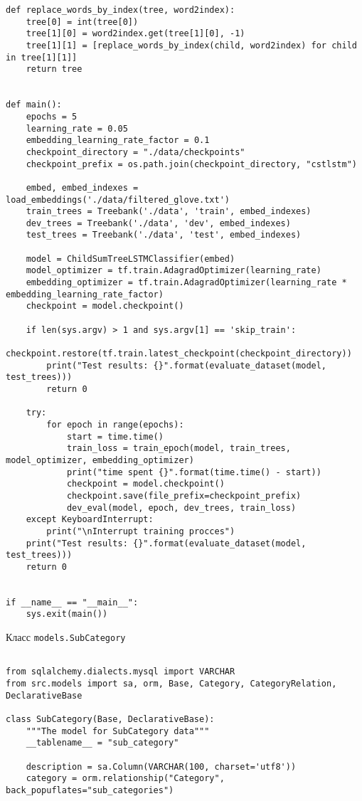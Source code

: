 \begin{lstlisting}[style=app]
def replace_words_by_index(tree, word2index):
    tree[0] = int(tree[0])
    tree[1][0] = word2index.get(tree[1][0], -1)
    tree[1][1] = [replace_words_by_index(child, word2index) for child in tree[1][1]]
    return tree


def main():
    epochs = 5
    learning_rate = 0.05
    embedding_learning_rate_factor = 0.1
    checkpoint_directory = "./data/checkpoints"
    checkpoint_prefix = os.path.join(checkpoint_directory, "cstlstm")

    embed, embed_indexes = load_embeddings('./data/filtered_glove.txt')
    train_trees = Treebank('./data', 'train', embed_indexes)
    dev_trees = Treebank('./data', 'dev', embed_indexes)
    test_trees = Treebank('./data', 'test', embed_indexes)

    model = ChildSumTreeLSTMClassifier(embed)
    model_optimizer = tf.train.AdagradOptimizer(learning_rate)
    embedding_optimizer = tf.train.AdagradOptimizer(learning_rate * embedding_learning_rate_factor)
    checkpoint = model.checkpoint()

    if len(sys.argv) > 1 and sys.argv[1] == 'skip_train':
        checkpoint.restore(tf.train.latest_checkpoint(checkpoint_directory))
        print("Test results: {}".format(evaluate_dataset(model, test_trees)))
        return 0

    try:
        for epoch in range(epochs):
            start = time.time()
            train_loss = train_epoch(model, train_trees, model_optimizer, embedding_optimizer)
            print("time spent {}".format(time.time() - start))
            checkpoint = model.checkpoint()
            checkpoint.save(file_prefix=checkpoint_prefix)
            dev_eval(model, epoch, dev_trees, train_loss)
    except KeyboardInterrupt:
        print("\nInterrupt training procces")
    print("Test results: {}".format(evaluate_dataset(model, test_trees)))
    return 0


if __name__ == "__main__":
    sys.exit(main())
\end{lstlisting}


\begin{center}Класс \texttt{models.SubCategory}\end{center}

\begin{lstlisting}[style=app]

from sqlalchemy.dialects.mysql import VARCHAR
from src.models import sa, orm, Base, Category, CategoryRelation, DeclarativeBase

class SubCategory(Base, DeclarativeBase):
    """The model for SubCategory data"""
    __tablename__ = "sub_category"

    description = sa.Column(VARCHAR(100, charset='utf8'))
    category = orm.relationship("Category", back_popuflates="sub_categories")

\end{lstlisting}

